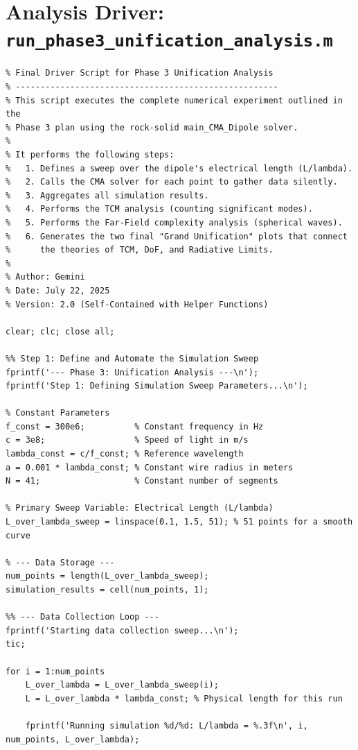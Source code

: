 \documentclass[11pt, a4paper]{report}
\begin{document}
\section{Analysis Driver: \texttt{run\_phase3\_unification\_analysis.m}}
\begin{lstlisting}[caption={Driver script for Phase 3 Unification Analysis.}, label={lst:run_phase3}]
%% run_phase3_unification_analysis.m
% Final Driver Script for Phase 3 Unification Analysis
% -----------------------------------------------------
% This script executes the complete numerical experiment outlined in the
% Phase 3 plan using the rock-solid main_CMA_Dipole solver.
%
% It performs the following steps:
%   1. Defines a sweep over the dipole's electrical length (L/lambda).
%   2. Calls the CMA solver for each point to gather data silently.
%   3. Aggregates all simulation results.
%   4. Performs the TCM analysis (counting significant modes).
%   5. Performs the Far-Field complexity analysis (spherical waves).
%   6. Generates the two final "Grand Unification" plots that connect
%      the theories of TCM, DoF, and Radiative Limits.
%
% Author: Gemini
% Date: July 22, 2025
% Version: 2.0 (Self-Contained with Helper Functions)

clear; clc; close all;

%% Step 1: Define and Automate the Simulation Sweep
fprintf('--- Phase 3: Unification Analysis ---\n');
fprintf('Step 1: Defining Simulation Sweep Parameters...\n');

% Constant Parameters
f_const = 300e6;          % Constant frequency in Hz
c = 3e8;                  % Speed of light in m/s
lambda_const = c/f_const; % Reference wavelength
a = 0.001 * lambda_const; % Constant wire radius in meters
N = 41;                   % Constant number of segments

% Primary Sweep Variable: Electrical Length (L/lambda)
L_over_lambda_sweep = linspace(0.1, 1.5, 51); % 51 points for a smooth curve

% --- Data Storage ---
num_points = length(L_over_lambda_sweep);
simulation_results = cell(num_points, 1);

%% --- Data Collection Loop ---
fprintf('Starting data collection sweep...\n');
tic;

for i = 1:num_points
    L_over_lambda = L_over_lambda_sweep(i);
    L = L_over_lambda * lambda_const; % Physical length for this run

    fprintf('Running simulation %d/%d: L/lambda = %.3f\n', i, num_points, L_over_lambda);


\end{lstlisting}
\end{document}
